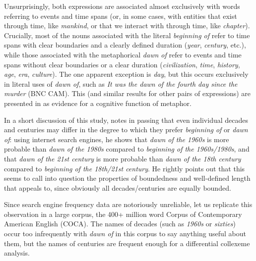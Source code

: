 Unsurprisingly, both expressions are associated  almost exclusively with words referring to events and time spans (or, in some cases, with entities that exist through time, like \textit{mankind}, or that we interact with through time, like \textit{chapter}). Crucially, most of the nouns  associated with the literal  \textit{beginning of} refer to time spans with clear boundaries and a clearly defined duration (\textit{year}, \textit{century}, etc.), while those associated  with the metaphorical  \textit{dawn of} refer to events and time spans without clear boundaries or a clear duration (\textit{civilization}, \textit{time}, \textit{history}, \textit{age}, \textit{era}, \textit{culture}). The one apparent exception is \textit{day}, but this occurs exclusively in literal  uses of \textit{dawn of}, such as \textit{It was the dawn of the fourth day since the murder} (BNC CAM). This (and similar results for other pairs of expressions) are presented in \citet{stefanowitsch_function_2005} as evidence for a cognitive  function  of metaphor.

In a short discussion of this study, \citet{liberman_what_2005} notes in passing that even individual decades and centuries may differ in the degree to which they prefer \textit{beginning of} or \textit{dawn of}: using internet search engines, he shows that \textit{dawn of the 1960s} is more probable than \textit{dawn of the 1980s} compared to \textit{beginning of the 1960s\slash 1980s}, and that \textit{dawn of the 21st century} is more probable than \textit{dawn of the 18th century} compared to \textit{beginning of the 18th\slash 21st century}. He rightly points out that this seems to call into question the properties of boundedness and well\hyp{}defined length that \citet{stefanowitsch_function_2005} appeals to, since obviously all decades\slash centuries are equally bounded.

Since search engine frequency data are notoriously unreliable, let us replicate  this observation in a large  corpus, the 400+ million word Corpus of Contemporary American English (COCA). The names of decades (such as \textit{1960s} or \textit{sixties}) occur too infrequently with \textit{dawn of} in this corpus to say anything useful about them, but the names of centuries are frequent enough for a differential collexeme  analysis.

